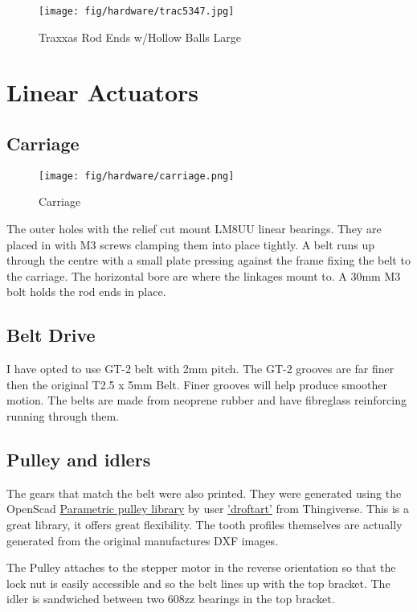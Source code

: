 \documentclass[a4paper, 11pt, twoside]{Thesis}  %
\begin{document}
\begin{figure}[H]
\centering%
\texttt{[image: fig/hardware/trac5347.jpg]}
\caption{Traxxas Rod Ends w/Hollow Balls Large}
\label{fig:trac5347.jpg}
\end{figure}\section{Linear Actuators}

\subsection{Carriage}
\begin{figure}[H]
\centering%
\texttt{[image: fig/hardware/carriage.png]}
\caption{Carriage}
\label{fig:carriage.png}
\end{figure}
The outer holes with the relief cut mount LM8UU linear bearings. They are placed in with M3 screws clamping them into place tightly. A belt runs up through the centre with a small plate pressing against the frame fixing the belt to the carriage. The horizontal bore are where the linkages mount to. A 30mm M3 bolt holds the rod ends in place.

\subsection{Belt Drive}
I have opted to use GT-2 belt with 2mm pitch. The GT-2 grooves are far finer then the original T2.5 x 5mm Belt. Finer grooves will help produce smoother motion. The belts are made from neoprene rubber and have  fibreglass reinforcing running through them.

\subsection{Pulley and idlers}
The gears that match the belt were also printed. They were generated using the OpenScad \href{http://www.thingiverse.com/thing:16627}{Parametric pulley library} by user \href{http://www.thingiverse.com/droftarts/designs}{'droftart'} from Thingiverse. This is a great library, it offers great flexibility. The tooth profiles themselves are actually generated from the original manufactures DXF images.

The Pulley attaches to the stepper motor in the reverse orientation so that the lock nut is easily accessible and so the belt lines up with the top bracket. The idler is sandwiched between two 608zz bearings in the top bracket.
\end{document}

